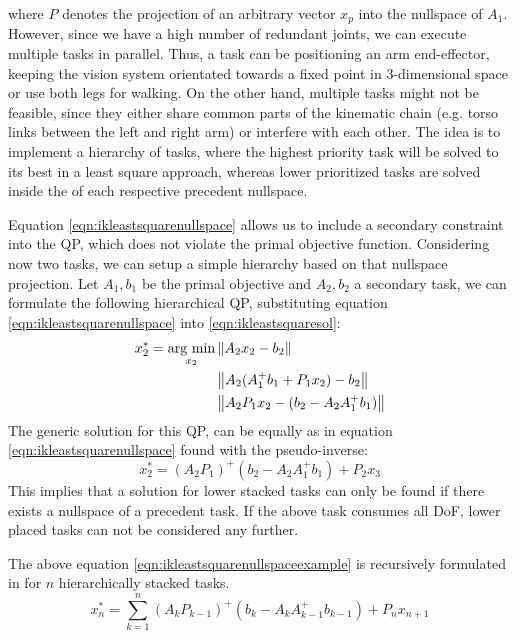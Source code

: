 where $P$ denotes the projection of an arbitrary vector $x_p$ into the nullspace of $A_1$. 
However, since we have a high number of redundant joints, we can execute multiple tasks in parallel. Thus, a task can be positioning an arm end-effector, keeping the vision system orientated towards a fixed point in 3-dimensional space or use both legs for walking. On the other hand, multiple tasks might not be feasible, since they either share common parts of the kinematic chain (e.g. torso links between the left and right arm) or interfere with each other. The idea is to implement a hierarchy of tasks, where the highest priority task will be solved to its best in a least square approach, whereas lower prioritized tasks are solved inside the of each respective precedent nullspace.

Equation \ref{eqn:ikleastsquarenullspace} allows us to include a secondary constraint into the QP, which does not violate the primal objective function. Considering now two tasks, we can setup a simple hierarchy based on that nullspace projection. Let $A_1,b_1$ be the primal objective and $A_2,b_2$ a secondary task, we can formulate the following hierarchical QP, substituting equation \ref{eqn:ikleastsquarenullspace} into \ref{eqn:ikleastsquaresol}:
\begin{eqnarray}
x_2^* =  \underset{x_2}{\text{arg min}} & \left\| A_2x_2 - b_2 \right \| \notag \\
& \left\| A_2(A_1^+b_1+P_1x_2) - b_2 \right \| \notag \\
& \left\| A_2P_1x_2 - (b_2 - A_2A_1^+b_1) \right \|
\end{eqnarray}
The generic solution for this QP, can be equally as in equation \ref{eqn:ikleastsquarenullspace} found with the pseudo-inverse:
\begin{equation}\label{eqn:ikleastsquarenullspaceexample}
x_2^* = (A_2P_1)^+ (b_2 - A_2A_1^+b_1)  + P_2x_3
\end{equation}
This implies that a solution for lower stacked tasks can only be found if there exists a nullspace of a precedent task. If the above task consumes all DoF, lower placed tasks can not be considered any further.

The above equation \ref{eqn:ikleastsquarenullspaceexample} is recursively formulated in \cite{siciliano1991general} for $n$ hierarchically stacked tasks.
\begin{equation}\label{eqn:ikleastsquarerecursive}
x^*_n = \sum_{k=1}^n (A_kP_{k-1})^+ (b_k - A_{k}A_{k-1}^+b_{k-1}) + P_nx_{n+1}
\end{equation}

